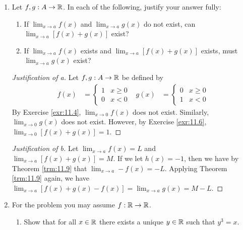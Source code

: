 \documentclass[../main.tex]{subfiles}
\begin{document}
\begin{enumerate}
\begin{proof}[Proof of c]
        Let $X_n=\{n\}$ for all $n\in\N$. By Exercise \ref{exr:10.5}, each $X_n$ is compact, as desired. However, $\bigcup_{n\in\N}X_n=\N$ is not compact: if we let $\mathcal{G}=\{(n-1,n+1):n\in\N\}$, then we have an open cover (clearly) that is infinite (clearly) and yet from which no term can be removed without revoking its status as an open cover.
    \end{proof}
    \item Let $f,g:A\to\mathbb{R}$. In each of the following, justify your answer fully:
    \begin{enumerate}
        \item If $\lim_{x\to a}f(x)$ and $\lim_{x\to a}g(x)$ do not exist, can $\lim_{x\to a}[f(x)+g(x)]$ exist?
        \item If $\lim_{x\to a}f(x)$ exists and $\lim_{x\to a}[f(x)+g(x)]$ exists, must $\lim_{x\to a}g(x)$ exist?
    \end{enumerate}
    \begin{proof}[Justification of a]
        Let $f,g:A\to\mathbb{R}$ be defined by
        \begin{align*}
            f(x) &=
            \begin{cases}
                1 & x\geq 0\\
                0 & x<0
            \end{cases}&
            g(x) &=
            \begin{cases}
                0 & x\geq 0\\
                1 & x<0
            \end{cases}
        \end{align*}
        By Exercise \ref{exr:11.4}, $\lim_{x\to 0}f(x)$ does not exist. Similarly, $\lim_{x\to 0}g(x)$ does not exist. However, by Exercise \ref{exr:11.6}, $\lim_{x\to 0}[f(x)+g(x)]=1$.
    \end{proof}
    \begin{proof}[Justification of b]
        Let $\lim_{x\to a}f(x)=L$ and $\lim_{x\to a}[f(x)+g(x)]=M$. If we let $h(x)=-1$, then we have by Theorem \ref{trm:11.9} that $\lim_{x\to a}-f(x)=-L$. Applying Theorem \ref{trm:11.9} again, we have $\lim_{x\to a}[f(x)+g(x)-f(x)]=\lim_{x\to a}g(x)=M-L$. 
    \end{proof}
    \item For the problem you may assume $f:\mathbb{R}\to\mathbb{R}$.
    \begin{enumerate}
        \item Show that for all $x\in\mathbb{R}$ there exists a unique $y\in\mathbb{R}$ such that $y^3=x$.

\end{enumerate}
\end{enumerate}
\end{document}
